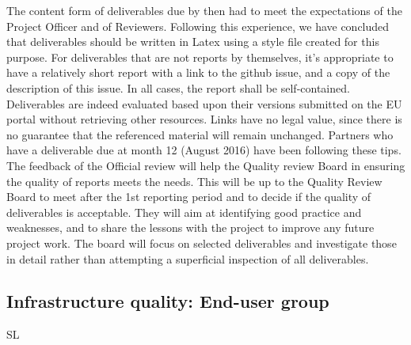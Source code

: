 \documentclass{../../Proposal/LaTeX-proposal/deliverablereport}
\begin{document}
The content form of deliverables due by then had to meet the expectations of the Project Officer and of Reviewers. Following this experience, we have concluded that deliverables should be written in Latex using a style file created for this purpose. For deliverables that are not reports by themselves, it's appropriate to have a relatively short report with a link to the github issue, and a copy of the description of this issue. In all cases, the report shall be self-contained. Deliverables are indeed evaluated based upon their versions submitted on the EU portal without retrieving other resources. Links have no legal value, since there is no guarantee that the referenced material will remain unchanged.
Partners who have a deliverable due at month 12 (August 2016) have been following these tips. The feedback of the Official review will help the Quality review Board in ensuring the quality of reports meets the needs. This will be up to the Quality Review Board to meet after the 1st reporting period and to decide if the quality of deliverables is acceptable.
They will aim at identifying good practice and weaknesses, and to share the lessons with the project to improve any future project work. The board will focus on selected deliverables and investigate those in detail rather than attempting a superficial inspection of all deliverables.


\subsection{Infrastructure quality: End-user group} 

SL
\end{document}

